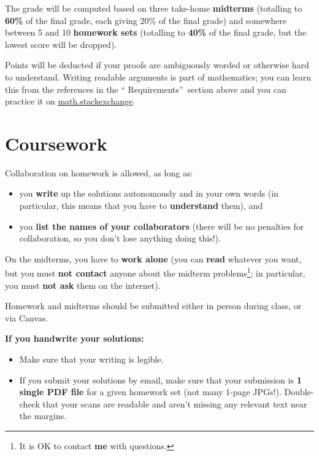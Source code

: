 \documentclass[numbers=enddot,12pt,final,onecolumn,notitlepage]{scrartcl}%
\theoremstyle{definition}
\begin{document}
The grade will be computed based on three take-home \textbf{midterms}
(totalling to \textbf{60\%} of the final grade, each giving 20\% of the final
grade) and somewhere between 5 and 10 \textbf{homework sets} (totalling to
\textbf{40\%} of the final grade, but the lowest score will be dropped).

Points will be deducted if your proofs are ambiguously worded or otherwise
hard to understand. Writing readable arguments is part of mathematics; you can
learn this from the references in the \textquotedblleft
Requirements\textquotedblright\ section above and you can practice it on
\href{https://math.stackexchange.com/}{math.stackexchange}.

\section{Coursework}

Collaboration on homework is allowed, as long as:

\begin{itemize}
\item you \textbf{write} up the solutions autonomously and in your own words
(in particular, this means that you have to \textbf{understand} them), and

\item you \textbf{list the names of your collaborators} (there will be no
penalties for collaboration, so you don't lose anything doing this!).
\end{itemize}

On the midterms, you have to \textbf{work alone} (you can \textbf{read}
whatever you want, but you must \textbf{not contact} anyone about the midterm
problems\footnote{It is OK to contact \textbf{me} with questions.}; in
particular, you must \textbf{not ask} them on the internet).

Homework and midterms should be submitted either in person during class, or
via Canvas.

\textbf{If you handwrite your solutions:}

\begin{itemize}
\item Make sure that your writing is legible.

\item If you submit your solutions by email, make sure that your submission is
\textbf{1 single PDF file} for a given homework set (not many 1-page JPGs!).
Double-check that your scans are readable and aren't missing any relevant text
near the margins.
\end{itemize}
\end{document}
